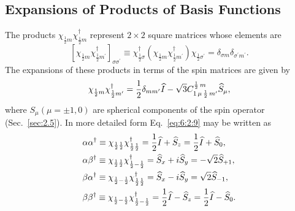 \subsection{Expansions of Products of Basis Functions}\label{sec:6.2.2}
The products $\chi_{\frac{1}{2} m} \chi_{\frac{1}{2} m}^{\dagger}$ represent $2 \times 2$ square matrices whose elements are
\begin{equation}
\left[\chi_{\frac{1}{2} m} \chi_{\frac{1}{2} m^{\prime}}^{\dagger}\right]_{\sigma \sigma^{\prime}} \equiv \chi_{\frac{1}{2} \sigma}^{\dagger}\left(\chi_{\frac{1}{2} m} \chi_{\frac{1}{2} m^{\prime}}^{\dagger}\right) \chi_{\frac{1}{2} \sigma^{\prime}}=\delta_{\sigma m} \delta_{\sigma^{\prime} m^{\prime}} . \label{eq:6:2:8}
\end{equation}
The expansions of these products in terms of the spin matrices are given by
\begin{equation}
\chi_{\frac{1}{2} m} \chi_{\frac{1}{2} m^{\prime}}^{\dagger}=\frac{1}{2} \delta_{m m^{\prime}} \widehat{I}-\sqrt{3} C_{1\,\mu\,\frac{1}{2}\,m^{\prime}}^{\frac{1}{2}\,m} \widehat{S}_{\mu}, \label{eq:6:2:9}
\end{equation}
where $S_{\mu}(\mu= \pm 1,0)$ are spherical components of the spin operator (Sec.~\ref{sec:2.5}). In more detailed form Eq.~\eqref{eq:6:2:9} may be written as
\begin{align}
& \alpha \alpha^{\dagger} \equiv \chi_{\frac{1}{2} \frac{1}{2}} \chi_{\frac{1}{2} \frac{1}{2}}^{\dagger}=\frac{1}{2} \widehat{I}+\widehat{S}_{z}=\frac{1}{2} \widehat{I}+\widehat{S}_{0} , \notag\\
& \alpha \beta^{\dagger} \equiv \chi_{\frac{1}{2} \frac{1}{2}} \chi_{\frac{1}{2}-\frac{1}{2}}^{\dagger}=\widehat{S}_{x}+i \widehat{S}_{y}=-\sqrt{2} \widehat{S}_{+1} , \label{eq:6:2:10}\\
& \beta \alpha^{\dagger} \equiv \chi_{\frac{1}{2}-\frac{1}{2}} \chi_{\frac{1}{2} \frac{1}{2}}^{\dagger}=\widehat{S}_{x}-i \widehat{S}_{y}=\sqrt{2} \widehat{S}_{-1} , \notag\\
& \beta \beta^{\dagger} \equiv \chi_{\frac{1}{2}-\frac{1}{2}} \chi_{\frac{1}{2}-\frac{1}{2}}^{\dagger}=\frac{1}{2} \widehat{I}-\widehat{S}_{z}=\frac{1}{2} \widehat{I}-\widehat{S}_{0} . \notag
\end{align}
